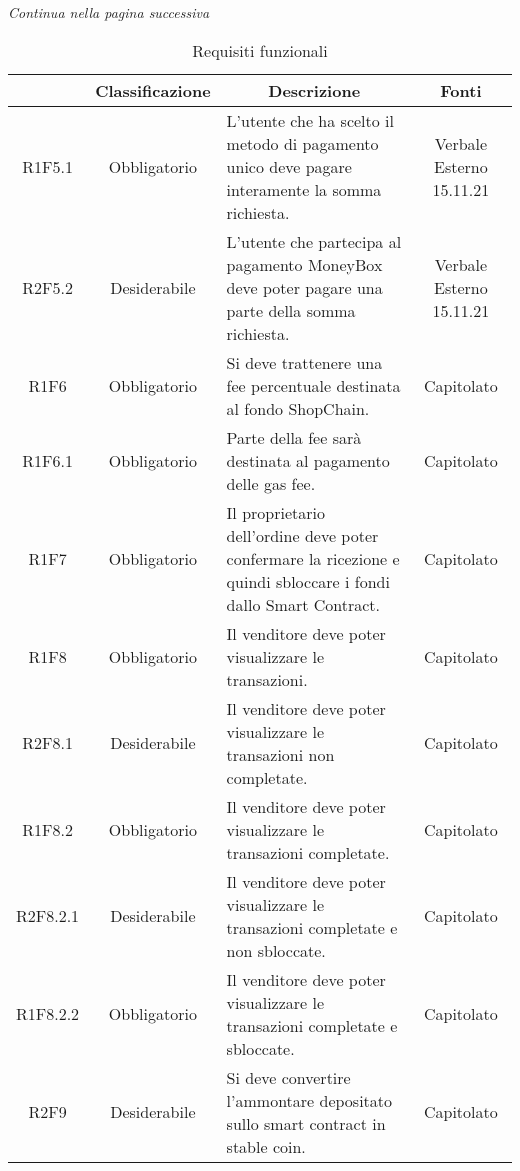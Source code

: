 \begin{center}
    \textit{\small Continua nella pagina successiva}
\end{center}
\begin{table}[H]
    \centering
    \renewcommand{\arraystretch}{1.8}
    \begin{tabular}{c | c | p{5cm} | c}
        \rowcolor[HTML]{125E28} 
        \multicolumn{1}{c}{\color[HTML]{FFFFFF} \textbf{Codice}} & 
		\multicolumn{1}{c}{\color[HTML]{FFFFFF} \textbf{Classificazione}} & 
		\multicolumn{1}{c}{\color[HTML]{FFFFFF} \textbf{Descrizione}} & 
		\multicolumn{1}{c}{\color[HTML]{FFFFFF} \textbf{Fonti}} \\
        \hline
        R1F5.1 & Obbligatorio & L'utente che ha scelto il metodo di pagamento unico deve pagare interamente la somma richiesta. & Verbale Esterno 15.11.21 \\
        R2F5.2 & Desiderabile & L'utente che partecipa al pagamento MoneyBox deve poter pagare una parte della somma richiesta. & Verbale Esterno 15.11.21 \\
        R1F6 & Obbligatorio & Si deve trattenere una fee percentuale destinata al fondo ShopChain. & Capitolato \\
        R1F6.1 & Obbligatorio & Parte della fee sarà destinata al pagamento delle gas fee\glo{}. & Capitolato \\
        R1F7 & Obbligatorio & Il proprietario dell'ordine deve poter confermare la ricezione e quindi sbloccare i fondi dallo Smart Contract. & Capitolato \\
        R1F8 & Obbligatorio & Il venditore deve poter visualizzare le transazioni. & Capitolato \\
        R2F8.1 & Desiderabile & Il venditore deve poter visualizzare le transazioni non completate. & Capitolato \\
        R1F8.2 & Obbligatorio & Il venditore deve poter visualizzare le transazioni completate. & Capitolato \\
        R2F8.2.1 & Desiderabile & Il venditore deve poter visualizzare le transazioni completate e non sbloccate. & Capitolato \\
        R1F8.2.2 & Obbligatorio & Il venditore deve poter visualizzare le transazioni completate e sbloccate. & Capitolato \\
        R2F9 & Desiderabile & Si deve convertire l'ammontare depositato sullo smart contract in stable coin. & Capitolato \\ 
    \end{tabular}
    \caption{Requisiti funzionali}
\end{table}


